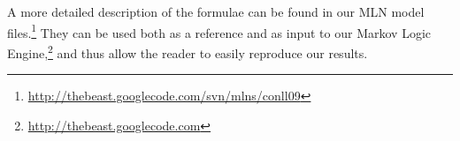 A more detailed description of the formulae can be found in our MLN model files.\footnote{\url{http://thebeast.googlecode.com/svn/mlns/conll09}} They can be 
used both as a reference and as input to our Markov Logic Engine,\footnote{\url{http://thebeast.googlecode.com}} and thus allow the reader 
to easily reproduce our results.



